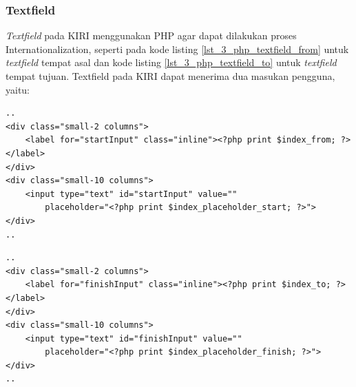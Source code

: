 \subsubsection{Textfield}
\textit{Textfield} pada KIRI menggunakan PHP agar dapat dilakukan proses Internationalization, seperti pada kode listing \ref{lst_3_php_textfield_from} untuk \textit{textfield} tempat asal dan kode listing \ref{lst_3_php_textfield_to} untuk \textit{textfield} tempat tujuan. Textfield pada KIRI dapat menerima dua masukan pengguna, yaitu:

\begin{lstlisting}[caption=Menampilkan \textit{textfield} tempat awal kepada pengguna ,label = {lst_3_php_textfield_from}]
..
<div class="small-2 columns">
	<label for="startInput" class="inline"><?php print $index_from; ?></label>
</div>
<div class="small-10 columns">
	<input type="text" id="startInput" value=""
		placeholder="<?php print $index_placeholder_start; ?>">
</div>
..
\end{lstlisting}

\begin{lstlisting}[caption=Menampilkan \textit{textfield} tempat tujuan kepada pengguna ,label = {lst_3_php_textfield_to}]
..
<div class="small-2 columns">
	<label for="finishInput" class="inline"><?php print $index_to; ?></label>
</div>
<div class="small-10 columns">
	<input type="text" id="finishInput" value=""
		placeholder="<?php print $index_placeholder_finish; ?>">
</div>
..
\end{lstlisting}

